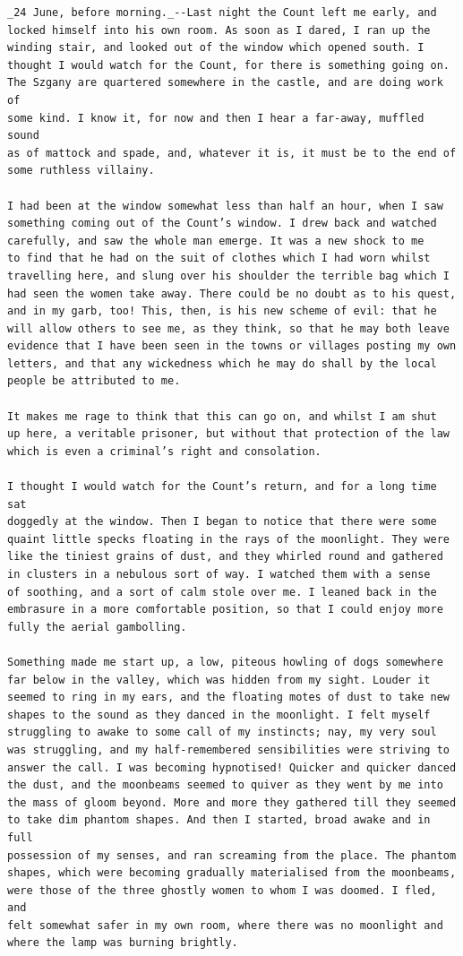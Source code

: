 \documentclass{article}
\begin{document}
\begin{verbatim}
_24 June, before morning._--Last night the Count left me early, and
locked himself into his own room. As soon as I dared, I ran up the
winding stair, and looked out of the window which opened south. I
thought I would watch for the Count, for there is something going on.
The Szgany are quartered somewhere in the castle, and are doing work of
some kind. I know it, for now and then I hear a far-away, muffled sound
as of mattock and spade, and, whatever it is, it must be to the end of
some ruthless villainy.

I had been at the window somewhat less than half an hour, when I saw
something coming out of the Count’s window. I drew back and watched
carefully, and saw the whole man emerge. It was a new shock to me
to find that he had on the suit of clothes which I had worn whilst
travelling here, and slung over his shoulder the terrible bag which I
had seen the women take away. There could be no doubt as to his quest,
and in my garb, too! This, then, is his new scheme of evil: that he
will allow others to see me, as they think, so that he may both leave
evidence that I have been seen in the towns or villages posting my own
letters, and that any wickedness which he may do shall by the local
people be attributed to me.

It makes me rage to think that this can go on, and whilst I am shut
up here, a veritable prisoner, but without that protection of the law
which is even a criminal’s right and consolation.

I thought I would watch for the Count’s return, and for a long time sat
doggedly at the window. Then I began to notice that there were some
quaint little specks floating in the rays of the moonlight. They were
like the tiniest grains of dust, and they whirled round and gathered
in clusters in a nebulous sort of way. I watched them with a sense
of soothing, and a sort of calm stole over me. I leaned back in the
embrasure in a more comfortable position, so that I could enjoy more
fully the aerial gambolling.

Something made me start up, a low, piteous howling of dogs somewhere
far below in the valley, which was hidden from my sight. Louder it
seemed to ring in my ears, and the floating motes of dust to take new
shapes to the sound as they danced in the moonlight. I felt myself
struggling to awake to some call of my instincts; nay, my very soul
was struggling, and my half-remembered sensibilities were striving to
answer the call. I was becoming hypnotised! Quicker and quicker danced
the dust, and the moonbeams seemed to quiver as they went by me into
the mass of gloom beyond. More and more they gathered till they seemed
to take dim phantom shapes. And then I started, broad awake and in full
possession of my senses, and ran screaming from the place. The phantom
shapes, which were becoming gradually materialised from the moonbeams,
were those of the three ghostly women to whom I was doomed. I fled, and
felt somewhat safer in my own room, where there was no moonlight and
where the lamp was burning brightly.


\end{verbatim}
\end{document}
